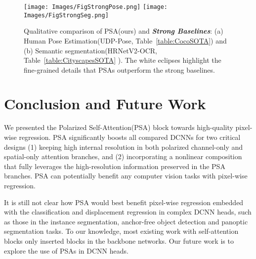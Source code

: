 \documentclass[10pt,twocolumn,letterpaper]{article}
\begin{document}
\begin{figure*}[!htb]
\centering
\texttt{[image: Images/FigStrongPose.png]}
\texttt{[image: Images/FigStrongSeg.png]}
\caption{Qualitative comparison of PSA(ours) and \textbf{\textsl{Strong Baselines}}: (a) Human Pose Estimation(UDP-Pose, Table~\ref{table:CocoSOTA}) and (b) Semantic segmentation(HRNetV2-OCR, Table~\ref{table:CityscapesSOTA} ). The white eclipses highlight the fine-grained details that PSAs outperform the strong baselines. }
  \label{fig:QualitativeStrong}
\end{figure*}

\section{Conclusion and Future Work}
We presented the Polarized Self-Attention(PSA) block towards high-quality pixel-wise regression. PSA significantly boosts all compared DCNNs for two critical designs (1) keeping high internal resolution in both polarized channel-only and spatial-only attention branches, and (2) incorporating a nonlinear composition that fully leverages the high-resolution information preserved in the PSA branches. PSA can potentially benefit any computer vision tasks with pixel-wise regression. 

It is still not clear how PSA would best benefit pixel-wise regression embedded with the classification and displacement regression in complex DCNN heads, such as those in the instance segmentation, anchor-free object detection and panoptic segmentation tasks. To our knowledge, most existing work with self-attention blocks only inserted blocks in the backbone networks. Our future work is to explore the use of PSAs in DCNN heads.





{\small


}
\end{document}
